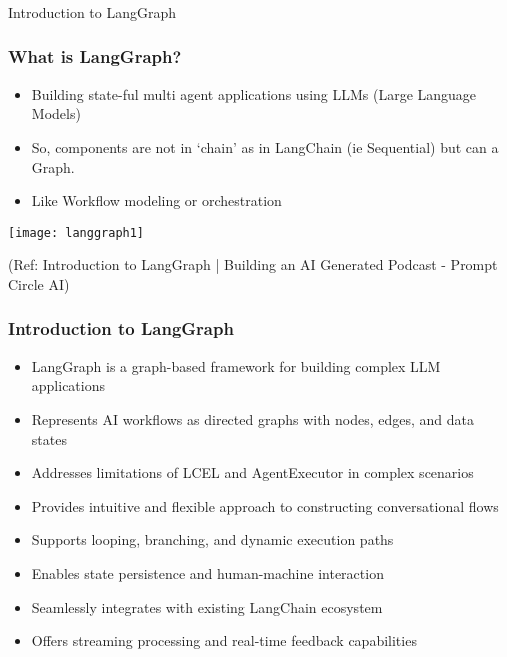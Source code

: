 \begin{frame}[fragile]\frametitle{}
\begin{center}
{\Large Introduction to LangGraph}
\end{center}
\end{frame}

\begin{frame}\frametitle{What is LangGraph?}

\begin{itemize}
\item Building state-ful multi agent applications using LLMs (Large Language Models)
\item So, components are not in `chain' as in LangChain (ie Sequential) but can a Graph.
\item Like Workflow modeling or orchestration
\end{itemize}

\begin{center}
\texttt{[image: langgraph1]}
\end{center}	  


{\tiny (Ref: Introduction to LangGraph | Building an AI Generated Podcast - Prompt Circle AI)}
\end{frame}

\begin{frame}[fragile]\frametitle{Introduction to LangGraph}
      \begin{itemize}
        \item LangGraph is a graph-based framework for building complex LLM applications
        \item Represents AI workflows as directed graphs with nodes, edges, and data states
        \item Addresses limitations of LCEL and AgentExecutor in complex scenarios
        \item Provides intuitive and flexible approach to constructing conversational flows
        \item Supports looping, branching, and dynamic execution paths
        \item Enables state persistence and human-machine interaction
        \item Seamlessly integrates with existing LangChain ecosystem
        \item Offers streaming processing and real-time feedback capabilities
      \end{itemize}
\end{frame}

